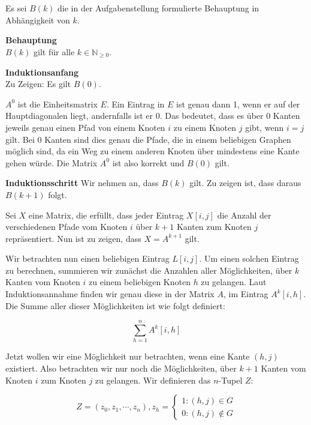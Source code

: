 \documentclass[10pt,a4paper,oneside,ngerman,numbers=noenddot]{scrartcl}
\begin{document}
\section{} %
	\subsection{} %
		Es sei $B(k)$ die in der Aufgabenstellung formulierte Behauptung in Abhängigkeit von $k$.

	    \textbf{Behauptung}\\ $B(k)$ gilt für alle $k \in \mathbb{N}_{\geq 0}$.

	    \textbf{Induktionsanfang}\\ Zu Zeigen: Es gilt $B(0)$.

	    $A^0$ ist die Einheitsmatrix $E$. Ein Eintrag in $E$ ist genau dann 1, wenn er auf der Hauptdiagonalen liegt, andernfalls ist er 0.
	    Das bedeutet, dass es über 0 Kanten jeweils genau einen Pfad von einem Knoten $i$ zu einem Knoten $j$ gibt, wenn $i = j$ gilt. Bei 0 Kanten sind
	    dies genau die Pfade, die in einem beliebigen Graphen möglich sind, da ein Weg zu einem anderen Knoten über mindestens eine Kante gehen würde.
	    Die Matrix $A^0$ ist also korrekt und $B(0)$ gilt.

	    \textbf{Induktionsschritt} Wir nehmen an, dass $B(k)$ gilt. Zu zeigen ist, dass daraus $B(k+1)$ folgt.

	    Sei $X$ eine Matrix, die erfüllt, dass jeder Eintrag $X[i,j]$ die Anzahl der verschiedenen Pfade vom Knoten $i$ über $k+1$ Kanten zum Knoten $j$ repräsentiert.
	    Nun ist zu zeigen, dass $X=A^{k+1}$ gilt.

	    Wir betrachten nun einen beliebigen Eintrag $L[i,j]$. Um einen solchen Eintrag zu berechnen, summieren wir zunächst die Anzahlen aller Möglichkeiten,
	    über $k$ Kanten vom Knoten $i$ zu einem beliebigen Knoten $h$ zu gelangen. Laut Induktionsannahme finden wir genau diese in der Matrix $A$,
	    im Eintrag $A^k[i,h]$. Die Summe aller dieser Möglichkeiten ist wie folgt definiert:

	    $$\sum_{h=1}^{n}{A^k[i,h]}$$

	    Jetzt wollen wir eine Möglichkeit nur betrachten, wenn eine Kante $(h,j)$ existiert.
	    Also betrachten wir nur noch die Möglichkeiten, über $k+1$ Kanten vom Knoten $i$ zum Knoten $j$ zu gelangen. Wir definieren das $n$-Tupel $Z$:

	    $$ Z=(z_0, z_1, \cdots, z_n), z_h = \left\{
	    \begin{array}{l}
	        1: (h,j) \in G \\
	        0: (h,j) \notin G
	    \end{array}\right.$$
\end{document}
